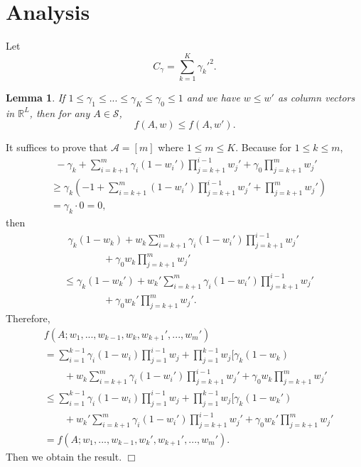 \documentclass{article}
\newcommand{\cA}{\mathcal{A}}
\newcommand{\cS}{\mathcal{S}}
\newcommand{\RR}{\mathbb{R}}
\newtheorem{lemma}[theorem]{Lemma}%
\newenvironment{proof}{\noindent {\textbf{Proof. }}}{$\Box$ \medskip}
\begin{document}
	
\section{Analysis}
Let
\begin{equation}
C_\gamma = \sum_{k=1}^{K} \gamma_k'^2.
\end{equation}
	
\begin{lemma}
\label{lem:increasing} 
If $1 \leq \gamma_1 \leq ... \leq \gamma_K \leq \gamma_0 \leq 1$ and we have $w \leq w'$ as column vectors in $\RR^L$, then for any $A\in\cS$,
$$
f(A, w) \leq f(A, w').
$$
\end{lemma}
\begin{proof}
It suffices to prove that $\cA = [m]$ where $1 \leq m \leq K$. Because for $1 \leq k \leq m$,
\begin{align*}
&~~-\gamma_k + \sum_{i=k+1}^m \gamma_i(1- w_i')\prod_{j=k+1}^{i-1}w_j' + \gamma_0\prod_{j=k+1}^{m}w_j'\\
&\geq \gamma_k (-1 + \sum_{i=k+1}^m (1- w_i')\prod_{j=k+1}^{i-1}w_j' +  \prod_{j=k+1}^{m}w_j')\\
&=\gamma_k \cdot 0 = 0,
\end{align*}
then
\begin{align*}
&~~\gamma_k (1 - w_k) + w_k\sum_{i=k+1}^m \gamma_i(1- w_i')\prod_{j=k+1}^{i-1}w_j'\\
&\qquad \qquad + \gamma_0 w_k\prod_{j=k+1}^{m}w_j'\\
& \leq \gamma_k (1 - w_k') + w_k'\sum_{i=k+1}^m \gamma_i(1- w_i')\prod_{j=k+1}^{i-1}w_j'\\
&\qquad \qquad + \gamma_0 w_k'\prod_{j=k+1}^{m}w_j'.
\end{align*}
Therefore, 
\begin{align*}
& f(A; w_1,...,w_{k-1},w_k,w_{k+1}',...,w_m')\\
&=\sum_{i=1}^{k-1} \gamma_i(1 - w_i)\prod_{j=1}^{i-1}w_j + \prod_{j=1}^{k-1}w_j [\gamma_k (1 - w_k) \\
&\qquad + w_k\sum_{i=k+1}^m \gamma_i(1- w_i')\prod_{j=k+1}^{i-1}w_j' + \gamma_0 w_k\prod_{j=k+1}^{m}w_j'\\
&\leq \sum_{i=1}^{k-1} \gamma_i(1 - w_i)\prod_{j=1}^{i-1}w_j + \prod_{j=1}^{k-1}w_j [\gamma_k (1 - w_k') \\
&\qquad + w_k'\sum_{i=k+1}^m \gamma_i(1- w_i')\prod_{j=k+1}^{i-1}w_j' + \gamma_0 w_k'\prod_{j=k+1}^{m}w_j'\\
&=f(A; w_1,...,w_{k-1},w_{k}',w_{k+1}',...,w_m').
\end{align*}
Then we obtain the result.
\end{proof}
	
\end{document}
